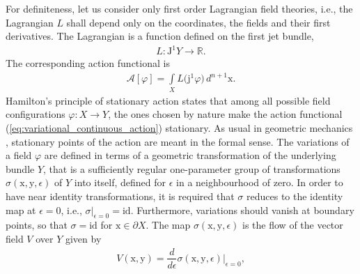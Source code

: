 \documentclass[12pt,a4paper,reqno]{article}
\begin{document}
For definiteness, let us consider only first order Lagrangian field theories,
i.e., the Lagrangian $L$ shall depend only on the coordinates, the fields and their first derivatives.
The Lagrangian is a function defined on the first jet bundle,
\begin{align}\label{eq:variational_continuous_lagrangian}
L : {\ensuremath{\mathrm{J}}}^{1} Y \rightarrow \mathbb{R} .
\end{align}
The corresponding action functional is
\begin{align}\label{eq:variational_continuous_action}
\mathcal{A} [{\ensuremath{\varphi}}] = \int \limits_{X} L \big( {\ensuremath{\mathrm{j}}}^{1} {\ensuremath{\varphi}} \big) \, d^{n+1} {\ensuremath{{\ensuremath{\mathrm{{x}}}}}} .
\end{align}
Hamilton's principle of stationary action \cite{JoseSaletan:1998, Arnold:1989, AbrahamMarsden:1978} states that among all possible field configurations ${\ensuremath{\varphi}} : X \rightarrow Y$, the ones chosen by nature make the action functional (\ref{eq:variational_continuous_action}) stationary.
As usual in geometric mechanics \cite{Holm:2009, MarsdenRatiu:2002, GotayMarsden:1998, MarsdenPatrick:1998}, stationary points of the action are meant in the formal sense.
The variations of a field ${\ensuremath{\varphi}}$ are defined in terms of a geometric transformation of the underlying bundle $Y$, that is a sufficiently regular one-parameter group of transformations $\sigma ({\ensuremath{{\ensuremath{\mathrm{{x}}}}}}, {\ensuremath{{\ensuremath{\mathrm{{y}}}}}}, {\ensuremath{\epsilon}})$ of $Y$ into itself, defined for ${\ensuremath{\epsilon}}$ in a neighbourhood of zero.
In order to have near identity transformations, it is required that $\sigma$ reduces to the identity map at ${\ensuremath{\epsilon}} = 0$, i.e., $\sigma \vert_{{\ensuremath{\epsilon}} = 0} = {\ensuremath{\mathrm{id}}}$.
Furthermore, variations should vanish at boundary points, so that $\sigma = {\ensuremath{\mathrm{id}}}$ for ${\ensuremath{{\ensuremath{\mathrm{{x}}}}}} \in \partial X$.
The map $\sigma ({\ensuremath{{\ensuremath{\mathrm{{x}}}}}}, {\ensuremath{{\ensuremath{\mathrm{{y}}}}}}, {\ensuremath{\epsilon}})$ is the flow of the vector field $V$ over $Y$ given by
\begin{align}\label{eq:variational_continuous_vector_field}
V ({\ensuremath{{\ensuremath{\mathrm{{x}}}}}}, {\ensuremath{{\ensuremath{\mathrm{{y}}}}}}) = \dfrac{d}{d{\ensuremath{\epsilon}}} \sigma ({\ensuremath{{\ensuremath{\mathrm{{x}}}}}}, {\ensuremath{{\ensuremath{\mathrm{{y}}}}}}, {\ensuremath{\epsilon}}) \bigg\vert_{{\ensuremath{\epsilon}}=0} ,
\end{align}
\end{document}
